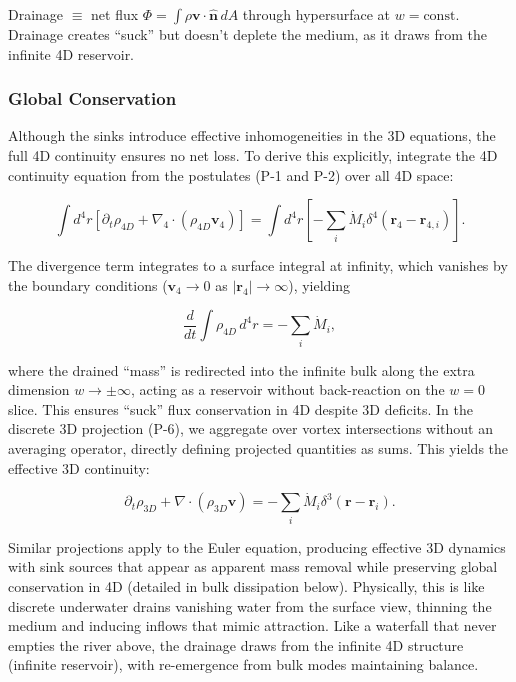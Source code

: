 Drainage $\equiv$ net flux $\Phi = \int \rho \mathbf{v} \cdot \hat{\mathbf{n}} \, dA$ through hypersurface at $w = \text{const}$. Drainage creates ``suck'' but doesn't deplete the medium, as it draws from the infinite 4D reservoir.

\subsubsection{Global Conservation}
Although the sinks introduce effective inhomogeneities in the 3D equations, the full 4D continuity ensures no net loss. To derive this explicitly, integrate the 4D continuity equation from the postulates (P-1 and P-2) over all 4D space:

\begin{equation}
\int d^4 r \left[ \partial_t \rho_{4D} + \nabla_4 \cdot (\rho_{4D} \mathbf{v}_4) \right] = \int d^4 r \left[ -\sum_i \dot{M}_i \delta^4(\mathbf{r}_4 - \mathbf{r}_{4,i}) \right].
\end{equation}

The divergence term integrates to a surface integral at infinity, which vanishes by the boundary conditions ($\mathbf{v}_4 \to 0$ as $|\mathbf{r}_4| \to \infty$), yielding

\begin{equation}
\frac{d}{dt} \int \rho_{4D} \, d^4 r = -\sum_i \dot{M}_i,
\end{equation}

where the drained ``mass'' is redirected into the infinite bulk along the extra dimension $w \to \pm \infty$, acting as a reservoir without back-reaction on the $w=0$ slice. This ensures ``suck'' flux conservation in 4D despite 3D deficits. In the discrete 3D projection (P-6), we aggregate over vortex intersections without an averaging operator, directly defining projected quantities as sums. This yields the effective 3D continuity:

\begin{equation}
\partial_t \rho_{3D} + \nabla \cdot (\rho_{3D} \mathbf{v}) = -\sum_i \dot{M}_i \delta^3(\mathbf{r} - \mathbf{r}_i).
\end{equation}

Similar projections apply to the Euler equation, producing effective 3D dynamics with sink sources that appear as apparent mass removal while preserving global conservation in 4D (detailed in bulk dissipation below). Physically, this is like discrete underwater drains vanishing water from the surface view, thinning the medium and inducing inflows that mimic attraction. Like a waterfall that never empties the river above, the drainage draws from the infinite 4D structure (infinite reservoir), with re-emergence from bulk modes maintaining balance.


